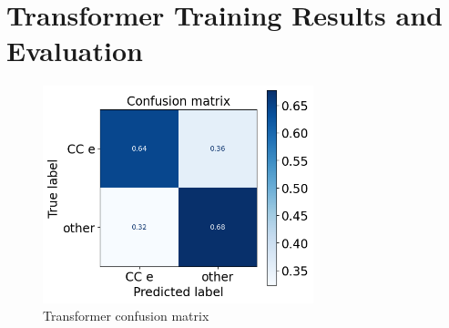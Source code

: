 \documentclass{pracalicmgr}
\begin{document}
\section{Transformer Training Results and Evaluation}

\begin{figure}[H]
    \centering
    \includegraphics[width=0.7\textwidth]{src/tranformerMatrixFinal.png}
    \caption{Transformer confusion matrix}
    \label{fig:tranformerMatrixFinal}
\end{figure}
\end{document}
